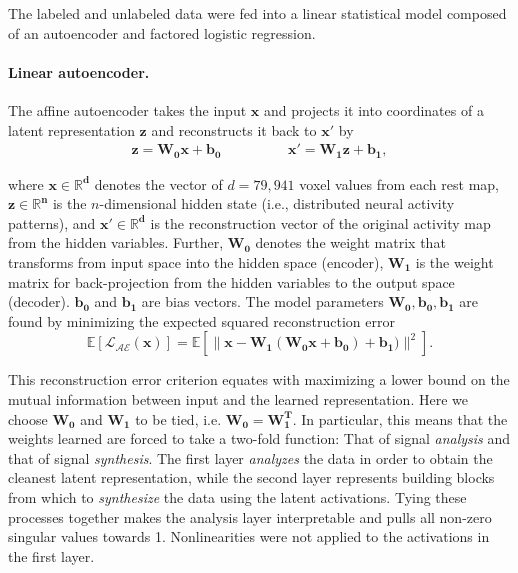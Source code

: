 \documentclass{article} %
\begin{document}
The labeled and unlabeled data were fed into a linear statistical model
composed of an autoencoder and factored logistic regression.

\paragraph{Linear autoencoder.}
The affine autoencoder takes the input 
$\mathbf{x}$ and projects it into coordinates of a
latent representation $\mathbf{z}$
and reconstructs it back to $\mathbf{x'}$ by
\begin{eqnarray}
    \mathbf{z} = \mathbf{W_0} \mathbf{x} + \mathbf{b_0} \hspace{2cm}
    \mathbf{x'} = \mathbf{W_1} \mathbf{z} + \mathbf{b_1},
  \label{eq:autoenc}
\end{eqnarray}

where $\mathbf{x \in \mathbb{R}^{d}}$ denotes the vector of $d=79{,}941$
voxel values from each
rest map,
$\mathbf{z \in \mathbb{R}^{n}}$ is the $n$-dimensional hidden state
(i.e., distributed neural activity patterns), and 
$\mathbf{x' \in \mathbb{R}^{d}}$
is the reconstruction vector of the original activity map
from the hidden variables. 
Further, $\mathbf{W_0}$ denotes the weight matrix that
transforms
from input space into the hidden space (encoder),
$\mathbf{W_1}$ is the weight matrix for back-projection
from the hidden variables to the
output space (decoder).
$\mathbf{b_0}$ and $\mathbf{b_1}$ are bias vectors.
The model parameters $\mathbf{W_0, b_0, b_1}$ are found by
minimizing the expected squared reconstruction error
\begin{equation}
  \mathbb E\left[{\mathcal{L_{AE}}}(\mathbf{x})\right] = %
  \mathbb E\left[\| \mathbf{x} - \mathbf{W_1}(\mathbf{W_0}\mathbf{x} + \mathbf{b_0}) + \mathbf{b_1}) \|^2\right].
\end{equation}

This reconstruction error criterion equates with
maximizing a lower bound on the mutual information between
input and the learned representation.
Here we choose $\mathbf{W_0}$ and $\mathbf{W_1}$ to be tied, i.e.
$\mathbf{W_0} = \mathbf{W_1^T}$. In particular, this means that the weights
learned are forced to take a two-fold function: That of signal 
\textit{analysis} and that of signal \textit{synthesis}.
The first layer \textit{analyzes}
the data in order to obtain the cleanest latent representation,
while the second
layer represents building blocks from which to \textit{synthesize} the data
using the latent activations.
Tying these processes together makes the analysis
layer interpretable and pulls all non-zero singular values towards 1. 
Nonlinearities were not applied to the
activations in the first layer.
\end{document}
